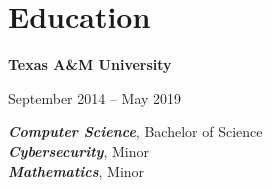 \documentclass[10pt,letterpaper]{article}
\newenvironment{onecolentry}{
    \begin{adjustwidth}{0cm}{0cm}
  }{
    \end{adjustwidth}
  }
\begin{document}
  \section{Education}
  \setcolumnwidth{\fill, 5 cm}
  \begin{paracol}{2}
    \textbf{Texas A\&M University}
    \switchcolumn
    \begin{flushright}
      September 2014 -- May 2019
    \end{flushright}
  \end{paracol}

  \vspace{-0.3cm}

  \begin{onecolentry}
    \hspace{10pt} \textbf{\emph{Computer Science}}, Bachelor of Science \\
    \hspace{10pt} \textbf{\emph{Cybersecurity}}, Minor \\
    \hspace{10pt} \textbf{\emph{Mathematics}}, Minor \\
  \end{onecolentry}
\end{document}
